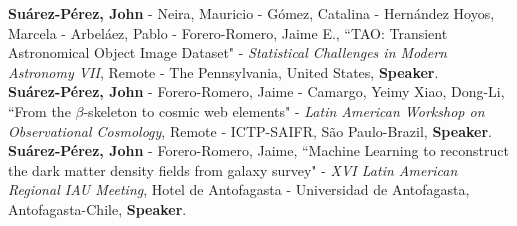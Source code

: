 \documentclass[10pt, a4paper]{article}
\newcommand{\years}[1]{\marginnote{\scriptsize #1}}
\begin{document}

\years{2021}\textbf{Suárez-Pérez, John} - Neira, Mauricio - Gómez, Catalina - Hernández Hoyos, Marcela - Arbeláez, Pablo - Forero-Romero, Jaime E., “TAO: Transient Astronomical Object Image Dataset" - \emph{Statistical Challenges in Modern Astronomy VII}, Remote - The Pennsylvania, United States, \textbf{Speaker}.\\ 


\years{2020}\textbf{Suárez-Pérez, John} - Forero-Romero, Jaime - Camargo, Yeimy  Xiao, Dong-Li, “From the $\beta$-skeleton to cosmic web elements" - \emph{Latin American Workshop on Observational Cosmology}, Remote - ICTP-SAIFR, São Paulo-Brazil, \textbf{Speaker}.\\




\years{2019}\textbf{Suárez-Pérez, John} - Forero-Romero, Jaime, “Machine Learning to reconstruct the dark matter density fields from galaxy survey" - \emph{XVI Latin American Regional IAU Meeting}, Hotel de Antofagasta - Universidad de Antofagasta, Antofagasta-Chile, \textbf{Speaker}.\\
\end{document}
